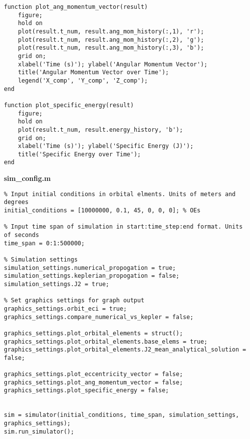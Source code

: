 \begin{lstlisting}
function plot_ang_momentum_vector(result)
    figure;
    hold on
    plot(result.t_num, result.ang_mom_history(:,1), 'r'); 
    plot(result.t_num, result.ang_mom_history(:,2), 'g');
    plot(result.t_num, result.ang_mom_history(:,3), 'b');
    grid on;
    xlabel('Time (s)'); ylabel('Angular Momentum Vector');
    title('Angular Momentum Vector over Time');
    legend('X_comp', 'Y_comp', 'Z_comp');
end

function plot_specific_energy(result)
    figure;
    hold on
    plot(result.t_num, result.energy_history, 'b'); 
    grid on;
    xlabel('Time (s)'); ylabel('Specific Energy (J)');
    title('Specific Energy over Time');
end
\end{lstlisting}

\textbf{sim\_config.m}
\begin{lstlisting}
% Input initial conditions in orbital elments. Units of meters and degrees
initial_conditions = [10000000, 0.1, 45, 0, 0, 0]; % OEs

% Input time span of simulation in start:time_step:end format. Units of seconds
time_span = 0:1:500000;

% Simulation settings
simulation_settings.numerical_propogation = true;
simulation_settings.keplerian_propogation = false;
simulation_settings.J2 = true;

% Set graphics settings for graph output
graphics_settings.orbit_eci = true;
graphics_settings.compare_numerical_vs_kepler = false;

graphics_settings.plot_orbital_elements = struct();
graphics_settings.plot_orbital_elements.base_elems = true;
graphics_settings.plot_orbital_elements.J2_mean_analytical_solution = false;

graphics_settings.plot_eccentricity_vector = false;
graphics_settings.plot_ang_momentum_vector = false;
graphics_settings.plot_specific_energy = false;


sim = simulator(initial_conditions, time_span, simulation_settings, graphics_settings);
sim.run_simulator();
\end{lstlisting}


